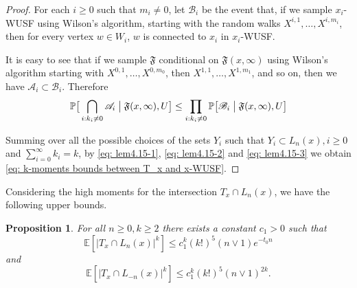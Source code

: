 \documentclass[12pt]{article}
\newtheorem{proposition}[theorem]{Proposition}
\numberwithin{equation}{section}
\newcommand{\be}{\begin{equation}}
\newcommand{\ee}{\end{equation}}
\newcommand{\1}{\mathbf{1}}
\begin{document}
\begin{proof}
 	For each $i\geq0$ such that $m_i\neq0$, let $\mathscr{B}_i$ be the event that, if we sample $x_i$-WUSF using Wilson's algorithm, starting with the random walks $X^{i,1},\ldots,X^{i,m_i}$, then for every vertex $w\in W_i$, $w$ is connected to $x_i$ in $x_i$-WUSF.
 	
 	It is easy to see that if we sample $\mathfrak{F}$ conditional on $\mathfrak{F}(x,\infty)$ using Wilson's algorithm starting with $X^{0,1},\ldots,X^{0,m_0}$, then $X^{1,1},\ldots,X^{1,m_1}$, and so on, then we have $\mathscr{A}_i\subset \mathscr{B}_i$. 
 	Therefore
 	\be\label{eq: lem4.15-3}
 	\mathbb{P}\big[\bigcap_{i:k_i\neq0}\mathscr{A}_i \bigm|\mathfrak{F}(x,\infty),U\big]
 	\leq \prod_{i:k_i\neq0}\mathbb{P}\big[\mathscr{B}_i \bigm|\mathfrak{F}(x,\infty),U\big]
 	\ee
 	
 	Summing over all the possible choices of the sets $Y_i$ such that $Y_i\subset L_n(x),i\geq0$ and $\sum_{i=0}^{\infty}k_i=k$, by \eqref{eq: lem4.15-1}, \eqref{eq: lem4.15-2} and \eqref{eq: lem4.15-3} we obtain \eqref{eq: k-moments bounds between T_x and x-WUSF}.
 	 \end{proof}
 
 	Considering the high moments for the intersection $T_x\cap L_n(x)$, we have the following upper bounds.
 \begin{proposition}\label{prop: high moments for T_x intersecting a slab}
  For all $n\geq0,k\geq2$ there exists a constant $c_{1}>0$ such that 
 	\be\label{eq: high moment for T_x intersecting a high slab }
 	\mathbb{E}[|T_x\cap L_n(x)|^k]\leq  c_{1}^k(k!)^5(n\vee 1)e^{-t_0n}
 	\ee
 	and
 	\be\label{eq: high moment for T_x intersecting a low slab }
 	\mathbb{E}[|T_x\cap L_{-n}(x)|^k]\leq c_{1}^k(k!)^5(n\vee 1)^{2k}.
 	\ee
 	
 \end{proposition}
\end{document}
